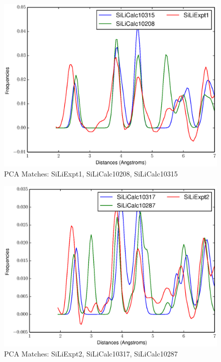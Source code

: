 \documentclass[12pt,letterpaper]{article}
\begin{document}
\begin{figure}[ht]
  \begin{center}
    \includegraphics[scale=0.8]{figs/PC3MatchSiLiExpt1-SiLiCalc10208-SiLiCalc10315.eps}
  \caption{PCA Matches: SiLiExpt1, SiLiCalc10208, SiLiCalc10315}
  \end{center}
\end{figure}

\begin{figure}[ht]
  \begin{center}
    \includegraphics[scale=0.8]{figs/PC3MatchSiLiExpt2-SiLiCalc10317-SiLiCalc10287.eps}
    \caption{PCA Matches: SiLiExpt2, SiLiCalc10317, SiLiCalc10287}
  \end{center}
\end{figure}
\end{document}
